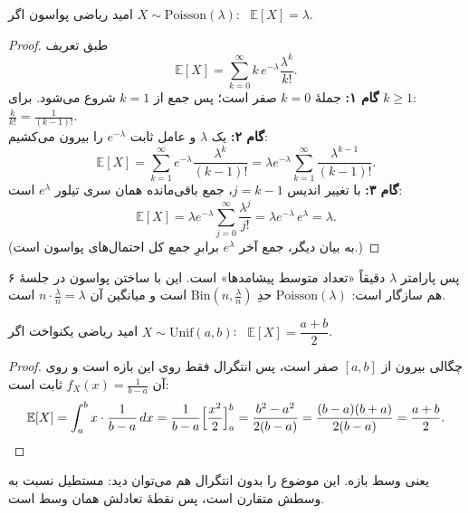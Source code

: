 \begin{proposition}[label=prop:E-pois]{امید ریاضی پواسون}
  اگر $X\sim\mathrm{Poisson}(\lambda)$: \ $\mathbb E[X]=\lambda$.
\end{proposition}
\begin{proof}
  طبق تعریف
  \[ \mathbb E[X]=\sum_{k=0}^{\infty}k\,e^{-\lambda}\frac{\lambda^k}{k!}. \]
  \textbf{گام ۱:} جملهٔ $k=0$ صفر است؛ پس جمع از $k=1$ شروع می‌شود. برای $k\ge1$: \ $\frac{k}{k!}=\frac{1}{(k-1)!}$.\\
  \textbf{گام ۲:} یک $\lambda$ و عامل ثابت $e^{-\lambda}$ را بیرون می‌کشیم:
  \[ \mathbb E[X]=\sum_{k=1}^{\infty}e^{-\lambda}\frac{\lambda^k}{(k-1)!}=\lambda e^{-\lambda}\sum_{k=1}^{\infty}\frac{\lambda^{k-1}}{(k-1)!}. \]
  \textbf{گام ۳:} با تغییر اندیس $j=k-1$، جمع باقی‌مانده همان سری تیلور $e^\lambda$ است:
  \[ \mathbb E[X]=\lambda e^{-\lambda}\sum_{j=0}^{\infty}\frac{\lambda^{j}}{j!}=\lambda e^{-\lambda}\,e^{\lambda}=\lambda. \]
  (به بیان دیگر، جمع آخر $e^\lambda$ برابرِ جمع کل احتمال‌های پواسون است.)
\end{proof}
پس پارامتر $\lambda$ دقیقاً «تعداد متوسط پیشامدها» است. این با ساختن پواسون در جلسهٔ ۶ هم سازگار است: $\mathrm{Poisson}(\lambda)$ حدِ $\mathrm{Bin}(n,\frac\lambda n)$ است و میانگین آن $n\cdot\frac\lambda n=\lambda$ است.

\begin{proposition}[label=prop:E-unif]{امید ریاضی یکنواخت}
  اگر $X\sim\mathrm{Unif}(a,b)$: \ $\mathbb E[X]=\dfrac{a+b}{2}$.
\end{proposition}
\begin{proof}
  چگالی بیرون از $[a,b]$ صفر است، پس انتگرال فقط روی این بازه است و روی آن $f_X(x)=\frac{1}{b-a}$ ثابت است:
  \[ \mathbb E[X]=\int_a^b x\cdot\frac{1}{b-a}\,dx=\frac{1}{b-a}\Bigl[\frac{x^2}{2}\Bigr]_a^b=\frac{b^2-a^2}{2(b-a)}=\frac{(b-a)(b+a)}{2(b-a)}=\frac{a+b}{2}. \]
\end{proof}
یعنی وسط بازه. این موضوع را بدون انتگرال هم می‌توان دید: مستطیل نسبت به وسطش متقارن است، پس نقطهٔ تعادلش همان وسط است.

